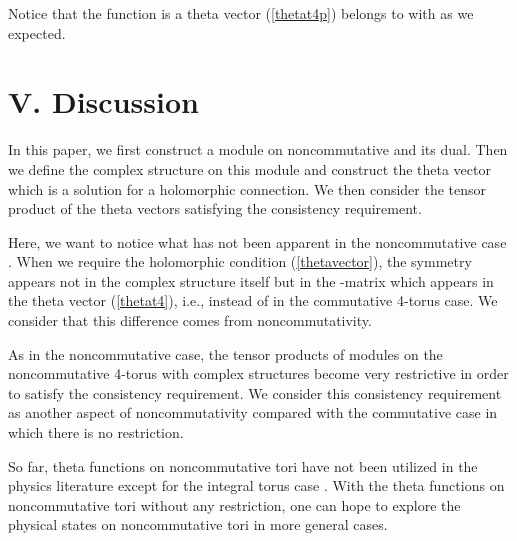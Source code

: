 \documentclass[12pt, a4paper]{article}
\begin{document}
Notice that the function \coordHE{} is a theta vector (\ref{thetat4p}) belongs to \coordHE{} with \coordHE{} as we expected.
\\




\section*{V. Discussion}

In this paper, we first construct a module on noncommutative \coordHE{}
and its dual. Then we define the complex structure on this module
and construct the theta vector which is a solution for a
holomorphic connection. We then consider the tensor product of the
theta vectors satisfying the consistency requirement.

Here, we want to notice what has not been apparent in the
noncommutative \coordHE{} case \cite{ds02}. When we require the
holomorphic condition (\ref{thetavector}), the symmetry appears
not in the complex structure itself but in the \myHighlight{$\Omega$}\coordHE{}-matrix
which appears in the theta vector (\ref{thetat4}), i.e.,
\coordHE{} instead of \coordHE{} in
the commutative 4-torus case. We consider that this difference
comes from noncommutativity.

As in the noncommutative \coordHE{} case, the tensor products of
modules on the noncommutative 4-torus with complex structures
become very restrictive in order to satisfy the consistency
requirement. We consider this consistency requirement as another
aspect of noncommutativity compared with the commutative case in
which there is no restriction.

So far, theta functions on noncommutative tori have not been
utilized in the physics literature except for the integral torus
case \cite{mm01,ghs01,hsy02}. With the theta functions on
noncommutative tori without any restriction, one can hope to
explore the physical states on noncommutative tori in more general
cases.
\\
\end{document}
